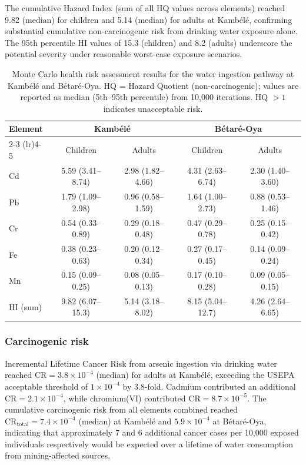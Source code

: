 \documentclass[preprint,12pt,number]{elsarticle}
\begin{document}
The cumulative Hazard Index (sum of all HQ values across elements) reached 9.82 (median) for children and 5.14 (median) for adults at Kamb\'{e}l\'{e}, confirming substantial cumulative non-carcinogenic risk from drinking water exposure alone. The 95th percentile HI values of 15.3 (children) and 8.2 (adults) underscore the potential severity under reasonable worst-case exposure scenarios.

\begin{table}[h!]
\centering
\caption{Monte Carlo health risk assessment results for the water ingestion pathway at Kamb\'{e}l\'{e} and B\'{e}tar\'{e}-Oya. HQ = Hazard Quotient (non-carcinogenic); values are reported as median (5th--95th percentile) from 10,000 iterations. HQ $> 1$ indicates unacceptable risk.}
\label{tab:hq}
\small
\begin{tabular}{lcccc}
\toprule
\multirow{2}{*}{Element} & \multicolumn{2}{c}{Kamb\'{e}l\'{e}} & \multicolumn{2}{c}{B\'{e}tar\'{e}-Oya} \\
\cmidrule(lr){2-3} \cmidrule(lr){4-5}
& Children & Adults & Children & Adults \\
\midrule
Cd & 5.59 (3.41--8.74) & 2.98 (1.82--4.66) & 4.31 (2.63--6.74) & 2.30 (1.40--3.60) \\
Pb & 1.79 (1.09--2.98) & 0.96 (0.58--1.59) & 1.64 (1.00--2.73) & 0.88 (0.53--1.46) \\
Cr & 0.54 (0.33--0.89) & 0.29 (0.18--0.48) & 0.47 (0.29--0.78) & 0.25 (0.15--0.42) \\
Fe & 0.38 (0.23--0.63) & 0.20 (0.12--0.34) & 0.27 (0.17--0.45) & 0.14 (0.09--0.24) \\
Mn & 0.15 (0.09--0.25) & 0.08 (0.05--0.13) & 0.17 (0.10--0.28) & 0.09 (0.05--0.15) \\
\midrule
HI (sum) & 9.82 (6.07--15.3) & 5.14 (3.18--8.02) & 8.15 (5.04--12.7) & 4.26 (2.64--6.65) \\
\bottomrule
\end{tabular}
\end{table}

\subsubsection{Carcinogenic risk}

Incremental Lifetime Cancer Risk from arsenic ingestion via drinking water reached $\text{CR} = 3.8 \times 10^{-4}$ (median) for adults at Kamb\'{e}l\'{e}, exceeding the USEPA acceptable threshold of $1 \times 10^{-4}$ by 3.8-fold. Cadmium contributed an additional $\text{CR} = 2.1 \times 10^{-4}$, while chromium(VI) contributed $\text{CR} = 8.7 \times 10^{-5}$. The cumulative carcinogenic risk from all elements combined reached $\text{CR}_\text{total} = 7.4 \times 10^{-4}$ (median) at Kamb\'{e}l\'{e} and $5.9 \times 10^{-4}$ at B\'{e}tar\'{e}-Oya, indicating that approximately 7 and 6 additional cancer cases per 10,000 exposed individuals respectively would be expected over a lifetime of water consumption from mining-affected sources.
\end{document}
